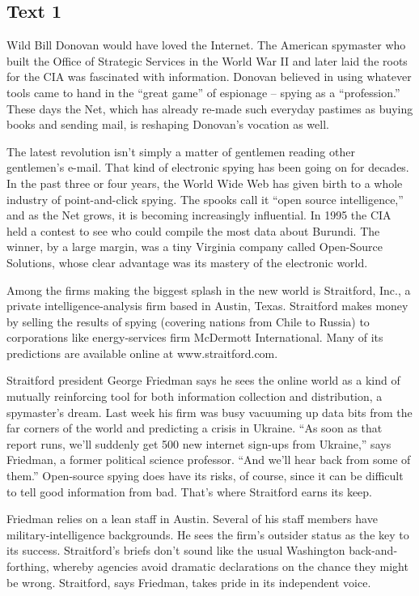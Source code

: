 \subsection{Text 1}
Wild Bill Donovan would have loved the Internet. The American spymaster who built the Office of Strategic Services in the World War II and later laid the roots for the CIA was fascinated with information. Donovan believed in using whatever tools came to hand in the “great game” of espionage -- spying as a “profession.” These days the Net, which has already re-made such everyday pastimes as buying books and sending mail, is reshaping Donovan’s vocation as well.

The latest revolution isn’t simply a matter of gentlemen reading other gentlemen’s e-mail. That kind of electronic spying has been going on for decades. In the past three or four years, the World Wide Web has given birth to a whole industry of point-and-click spying. The spooks call it “open source intelligence,” and as the Net grows, it is becoming increasingly influential. In 1995 the CIA held a contest to see who could compile the most data about Burundi. The winner, by a large margin, was a tiny Virginia company called Open-Source Solutions, whose clear advantage was its mastery of the electronic world.

Among the firms making the biggest splash in the new world is Straitford, Inc., a private intelligence-analysis firm based in Austin, Texas. Straitford makes money by selling the results of spying (covering nations from Chile to Russia) to corporations like energy-services firm McDermott International. Many of its predictions are available online at www.straitford.com.

Straitford president George Friedman says he sees the online world as a kind of mutually reinforcing tool for both information collection and distribution, a spymaster’s dream. Last week his firm was busy vacuuming up data bits from the far corners of the world and predicting a crisis in Ukraine. “As soon as that report runs, we’ll suddenly get 500 new internet sign-ups from Ukraine,” says Friedman, a former political science professor. “And we’ll hear back from some of them.” Open-source spying does have its risks, of course, since it can be difficult to tell good information from bad. That’s where Straitford earns its keep.

Friedman relies on a lean staff in Austin. Several of his staff members have military-intelligence backgrounds. He sees the firm’s outsider status as the key to its success. Straitford’s briefs don’t sound like the usual Washington back-and-forthing, whereby agencies avoid dramatic declarations on the chance they might be wrong. Straitford, says Friedman, takes pride in its independent voice.

